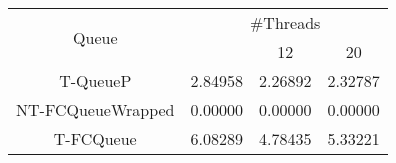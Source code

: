 \begin{tabular}{|c|c|c|c|}
\hline
\multirow{2}{*}{Queue} & \multicolumn{3}{c|}{\#Threads}\\\cline{2-4}& \quad 4 & 12 & 20\\
\hline
\hline
T-QueueP & 2.84958 & 2.26892 & 2.32787\\
NT-FCQueueWrapped & 0.00000 & 0.00000 & 0.00000\\
T-FCQueue & 6.08289 & 4.78435 & 5.33221\\
\hline\end{tabular}
